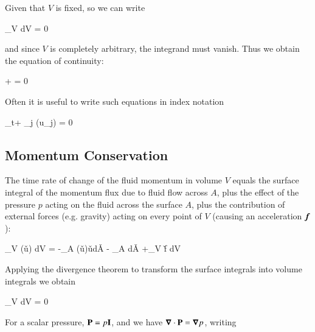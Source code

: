\noindent Given that $V$ is fixed, so we can write

\beq
\int_V dV = 0 
\eeq

\noindent and since $V$ is completely arbitrary, the integrand must vanish. Thus we obtain the
equation of continuity:

\beq
\ptderiv{\rho} +  = 0
\label{eq:continuity-conservative}
\eeq


Often it is useful to write such equations in index notation 

\beq
\partial_t\rho + \partial_j \left(\rho u_j\right) = 0 
\eeq


\subsection{Momentum Conservation}

The time rate of change of the fluid momentum in volume $V$ equals the surface integral
of the momentum flux due to fluid flow across $A$, plus the eﬀect of the pressure $p$ acting
on the fluid across the surface $A$, plus the contribution of external forces (e.g. gravity)
acting on every point of $V$ (causing an acceleration ${\boldsymbol{f}}$):

\beq
{} \int_V \left(\rho \v{u}\right) dV = -\oint_A \left(\rho  \v{u}\right)\v{u}\cdot d\v{A} - \oint_A  \cdot d\v{A}  +\int_V \rho\v{f} dV
\eeq

Applying the divergence theorem to transform the surface integrals into volume integrals
we obtain 

\beq
\int_V dV = 0 
\eeq

For a scalar pressure, $\boldsymbol{\mathrm{P}}=p\boldsymbol{\mathrm{I}}$, and we have
${\boldsymbol{\nabla}}\cdot{\boldsymbol{\mathrm{P}}}={\boldsymbol{\nabla}}{p}$, writing 

